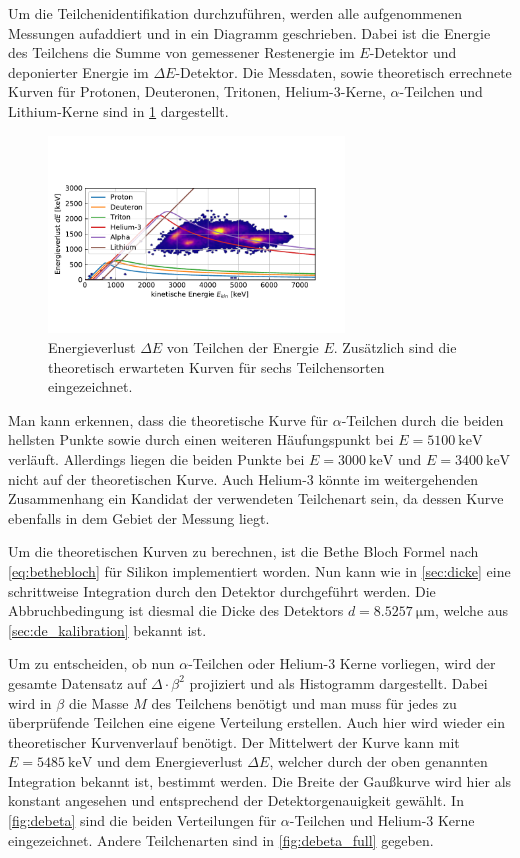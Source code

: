 Um die Teilchenidentifikation durchzuführen, werden alle aufgenommenen Messungen aufaddiert und in ein Diagramm geschrieben.
Dabei ist die Energie des Teilchens die Summe von gemessener Restenergie im $E$-Detektor und deponierter Energie im $\Delta E$-Detektor.
Die Messdaten, sowie theoretisch errechnete Kurven für Protonen, Deuteronen, Tritonen, Helium-3-Kerne, $\alpha$-Teilchen und Lithium-Kerne sind in \cref{fig:energieverlust} dargestellt.

\begin{figure}[ht]
	\centering
	\includegraphics[width=0.7\textwidth]{dat/energieverlust.pdf}
	\caption{Energieverlust $\Delta E$ von Teilchen der Energie $E$. Zusätzlich sind die theoretisch erwarteten Kurven für sechs Teilchensorten eingezeichnet.}
	\label{fig:energieverlust}
\end{figure}

Man kann erkennen, dass die theoretische Kurve für $\alpha$-Teilchen durch die beiden hellsten Punkte sowie durch einen weiteren Häufungspunkt bei $E=\SI{5100}{\kilo\electronvolt}$ verläuft.
Allerdings liegen die beiden Punkte bei $E = \SI{3000}{\kilo\electronvolt}$ und $E=\SI{3400}{\kilo\electronvolt}$ nicht auf der theoretischen Kurve.
Auch Helium-3 könnte im weitergehenden Zusammenhang ein Kandidat der verwendeten Teilchenart sein, da dessen Kurve ebenfalls in dem Gebiet der Messung liegt.

Um die theoretischen Kurven zu berechnen, ist die Bethe Bloch Formel nach \cref{eq:bethebloch} für Silikon implementiert worden.
Nun kann wie in \cref{sec:dicke} eine schrittweise Integration durch den Detektor durchgeführt werden.
Die Abbruchbedingung ist diesmal die Dicke des Detektors $d = \SI{8.5257}{\micro\meter}$, welche aus \cref{sec:de_kalibration} bekannt ist.

Um zu entscheiden, ob nun $\alpha$-Teilchen oder Helium-3 Kerne vorliegen, wird der gesamte Datensatz auf $\Delta \cdot \beta^2$ projiziert und als Histogramm dargestellt.
Dabei wird in $\beta$ die Masse $M$ des Teilchens benötigt und man muss für jedes zu überprüfende Teilchen eine eigene Verteilung erstellen.
Auch hier wird wieder ein theoretischer Kurvenverlauf benötigt.
Der Mittelwert der Kurve kann mit $E = \SI{5485}{\kilo\electronvolt}$ und dem Energieverlust $\Delta E$, welcher durch der oben genannten Integration bekannt ist, bestimmt werden.
Die Breite der Gaußkurve wird hier als konstant angesehen und entsprechend der Detektorgenauigkeit gewählt.
In \cref{fig:debeta} sind die beiden Verteilungen für $\alpha$-Teilchen und Helium-3 Kerne eingezeichnet.
Andere Teilchenarten sind in \cref{fig:debeta_full} gegeben.

